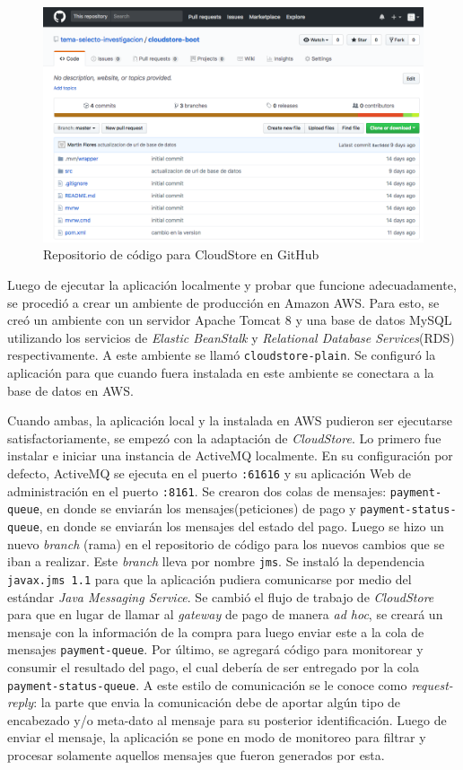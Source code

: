 \documentclass[11pt, twoside]{report}
\begin{document}
\begin{figure}[h]
  \centering
  \includegraphics[width=15cm]{github-cloudstore-1}
  \caption{\small{Repositorio de código para CloudStore en GitHub}}
  \label{fig:github-cloudstore-1}
\end{figure}

Luego de ejecutar la aplicación localmente y probar que funcione adecuadamente, se procedió a crear un ambiente de producción en Amazon AWS. Para esto, se creó un ambiente con un servidor Apache Tomcat 8 y una base de datos MySQL utilizando los servicios de \emph{Elastic BeanStalk} y \emph{Relational Database Services}(RDS) respectivamente. A este ambiente se llamó \texttt{cloudstore-plain}. Se configuró la aplicación para que cuando fuera instalada en este ambiente se conectara a la base de datos en AWS.

Cuando ambas, la aplicación local y la instalada en AWS pudieron ser ejecutarse satisfactoriamente, se empezó con la adaptación de \emph{CloudStore}. Lo primero fue instalar e iniciar una instancia de ActiveMQ localmente. En su configuración por defecto, ActiveMQ se ejecuta en el puerto \texttt{:61616} y su aplicación Web de administración en el puerto \texttt{:8161}. Se crearon dos colas de mensajes: \texttt{payment-queue}, en donde se enviarán los mensajes(peticiones) de pago y \texttt{payment-status-queue}, en donde se enviarán los mensajes del estado del pago.  Luego se hizo un nuevo \emph{branch} (rama) en el repositorio de código para los nuevos cambios que se iban a realizar. Este \emph{branch} lleva por nombre \texttt{jms}. Se instaló la dependencia \texttt{javax.jms 1.1} para que la aplicación pudiera comunicarse por medio del estándar \emph{Java Messaging Service}. Se cambió el flujo de trabajo de \emph{CloudStore} para que en lugar de llamar al \emph{gateway} de pago de manera \emph{ad hoc}, se creará un mensaje con la información de la compra para luego enviar este a la cola de mensajes \texttt{payment-queue}. Por último, se agregará código para monitorear y consumir el resultado del pago, el cual debería de ser entregado por la cola \texttt{payment-status-queue}. A este estilo de comunicación se le conoce como \emph{request-reply}: la parte que envia la comunicación debe de aportar algún tipo de encabezado y/o meta-dato al mensaje para su posterior identificación. Luego de enviar el mensaje, la aplicación se pone en modo de monitoreo para filtrar y procesar solamente aquellos mensajes que fueron generados por esta. 
\end{document}
